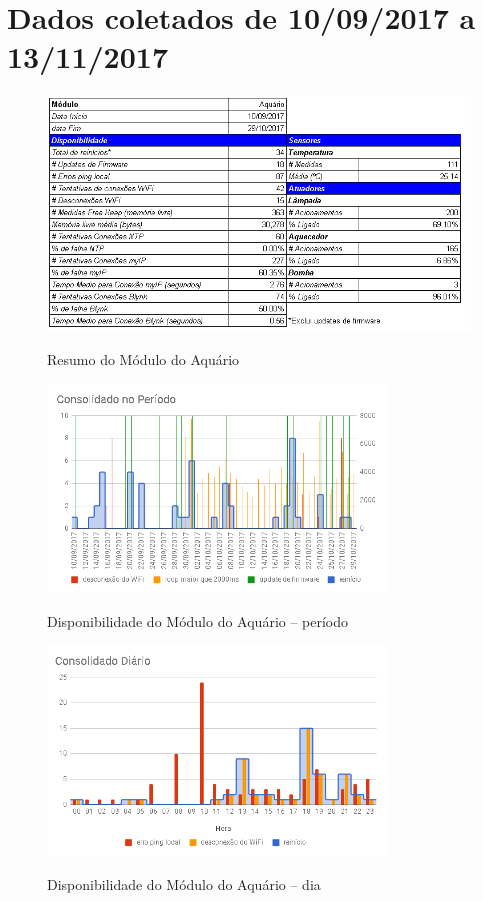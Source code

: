 \chapter{Dados coletados de 10/09/2017 a 13/11/2017}
\label{DataCollected}

\begin{figure}[H]
	\centering
	\caption{Resumo do Módulo do Aquário}
	\includegraphics[width=1.0\textwidth]{resumoAqua}
	\label{fig:resumoAqua}
\end{figure}

\begin{figure}[H]
	\centering
	\caption{Disponibilidade do Módulo do Aquário -- período}
	\includegraphics[width=0.8\textwidth]{AquaPeriodo}
	\label{fig:AquaPeriodo}
\end{figure}

\begin{figure}[H]
	\centering
	\caption{Disponibilidade do Módulo do Aquário -- dia}
	\includegraphics[width=0.8\textwidth]{AquaDiaDisp}
	\label{fig:AquaDiaDisp}
\end{figure}

